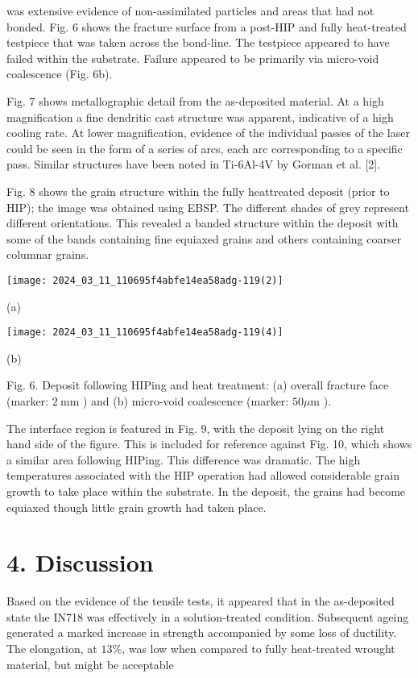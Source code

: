 \documentclass[10pt]{article}
\begin{document}
was extensive evidence of non-assimilated particles and areas that had not bonded. Fig. 6 shows the fracture surface from a post-HIP and fully heat-treated testpiece that was taken across the bond-line. The testpiece appeared to have failed within the substrate. Failure appeared to be primarily via micro-void coalescence (Fig. 6b).

Fig. 7 shows metallographic detail from the as-deposited material. At a high magnification a fine dendritic cast structure was apparent, indicative of a high cooling rate. At lower magnification, evidence of the individual passes of the laser could be seen in the form of a series of arcs, each arc corresponding to a specific pass. Similar structures have been noted in Ti-6Al-4V by Gorman et al. [2].

Fig. 8 shows the grain structure within the fully heattreated deposit (prior to HIP); the image was obtained using EBSP. The different shades of grey represent different orientations. This revealed a banded structure within the deposit with some of the bands containing fine equiaxed grains and others containing coarser columnar grains.

\begin{center}
\texttt{[image: 2024\_03\_11\_110695f4abfe14ea58adg-119(2)]}
\end{center}

(a)

\begin{center}
\texttt{[image: 2024\_03\_11\_110695f4abfe14ea58adg-119(4)]}
\end{center}

(b)

Fig. 6. Deposit following HIPing and heat treatment: (a) overall fracture face (marker: $2 \mathrm{~mm}$ ) and (b) micro-void coalescence (marker: $50 \mu \mathrm{m}$ ).

The interface region is featured in Fig. 9, with the deposit lying on the right hand side of the figure. This is included for reference against Fig. 10, which shows a similar area following HIPing. This difference was dramatic. The high temperatures associated with the HIP operation had allowed considerable grain growth to take place within the substrate. In the deposit, the grains had become equiaxed though little grain growth had taken place.

\section*{4. Discussion}
Based on the evidence of the tensile tests, it appeared that in the as-deposited state the IN718 was effectively in a solution-treated condition. Subsequent ageing generated a marked increase in strength accompanied by some loss of ductility. The elongation, at $13 \%$, was low when compared to fully heat-treated wrought material, but might be acceptable
\end{document}
